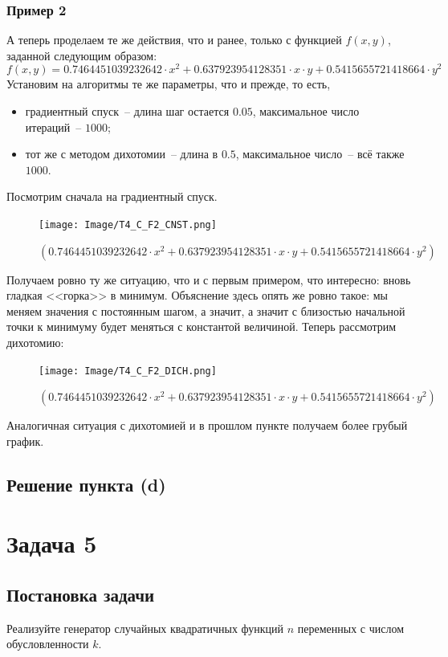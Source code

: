 \documentclass[12pt, a4paper, oneside, final]{article}
\begin{document}
	\subsubsection*{Пример 2}
	А теперь проделаем те же действия, что и ранее, только с функцией $f(x, y)$, заданной следующим образом:
	\[
		f(x, y) = 0.7464451039232642 \cdot x^{2} + 0.637923954128351 \cdot x \cdot y + 0.5415655721418664 \cdot y^{2}
	\]
	Установим на алгоритмы те же параметры, что и прежде, то есть,
	\begin{itemize}
		\item градиентный спуск~-- длина шаг остается $0.05$, максимальное число итераций~-- $1000$;
		\item тот же с методом дихотомии~-- длина в $0.5$, максимальное число~-- всё также $1000$.
	\end{itemize}
	Посмотрим сначала на градиентный спуск.
	\begin{figure}[H]
		\centering
		\texttt{[image: Image/T4\_C\_F2\_CNST.png]}
		\caption{$(0.7464451039232642 \cdot x^{2} + 0.637923954128351 \cdot x \cdot y + 0.5415655721418664 \cdot y^{2})$}
	\end{figure}
	Получаем ровно ту же ситуацию, что и с первым примером, что интересно: вновь гладкая <<горка>> в минимум. Объяснение здесь опять же ровно такое: мы меняем значения с постоянным шагом, а значит, а значит с близостью начальной точки к минимуму будет меняться с константой величиной. Теперь рассмотрим дихотомию:
	\begin{figure}[H]
		\centering
		\texttt{[image: Image/T4\_C\_F2\_DICH.png]}
		\caption{$(0.7464451039232642 \cdot x^{2} + 0.637923954128351 \cdot x \cdot y + 0.5415655721418664 \cdot y^{2})$}
	\end{figure}
	Аналогичная ситуация с дихотомией и в прошлом пункте получаем более грубый график.
	\subsection*{Решение пункта (d)}
	\newpage
	\section*{Задача 5}
	\subsection*{Постановка задачи}
	Реализуйте генератор случайных квадратичных функций $n$ переменных с числом обусловленности $k$.
\end{document}
